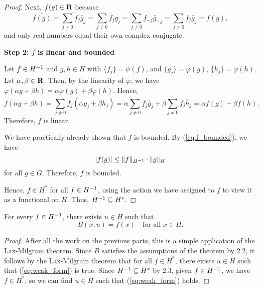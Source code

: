 \documentclass{homework}
\begin{document}
\begin{arabicparts}
\begin{proof}
			Next, $f(g) \in \textbf{R}$ because
			\begin{equation}
				\overline{f(g)}=\overline{\sum_{j\ne0}f_j\bar{g}_j} = \sum_{j\ne0}\bar{f}_jg_j = \sum_{j\ne0}f_{-j}\bar{g}_{-j} = \sum_{j\ne0}f_j\bar{g}_j = f(g),
			\end{equation}
			and only real numbers equal their own complex conjugate.
			
			\textbf{Step 2: $f$ is linear and bounded}
			
			Let $f \in {H^{-1}}$ and $g,h \in H$ with $\{f_j\} = \psi(f)$, and $\{g_j\} = \varphi(g)$, $\{h_j\} = \varphi(h)$. Let $\alpha,\beta\in\textbf{R}$. Then, by the linearity of $\varphi$, we have $\varphi(\alpha g + \beta h) = \alpha\varphi(g) + \beta\varphi(h)$. Hence,
			\begin{equation}
				f(\alpha g + \beta h) = \sum_{j\ne0} f_j\overline{(\alpha g_j + \beta h_j)} = \alpha\sum_{j\ne0}f_j\bar{g}_j + \beta\sum_{j\ne0}f_j\bar{h}_j = \alpha f(g) + \beta f(h).
			\end{equation}
			Therefore, $f$ is linear.
			
			We have practically already shown that $f$ is bounded. By (\ref{eq:f_bounded}), we have
			\begin{equation}
				|f(g)| \le \lVert f\rVert_{H^{-1}}\cdot\lVert g\rVert_H
			\end{equation}
			for all $g \in G$. Therefore, $f$ is bounded.
			
			Hence, $f \in H^*$ for all $f \in {H^{-1}}$, using the action we have assigned to $f$ to view it as a functional on $H$. Thus, ${H^{-1}} \subseteq H^*$.
		\end{proof}
		
		\questionpart
		For every $f \in {H^{-1}}$, there exists $u \in H$ such that
		\begin{equation}
			\label{eq:weak_form}
			B(x,u) = f(x) \quad\text{for all } x\in H.
		\end{equation}
		
		\begin{proof}
			After all the work on the previous parts, this is a simple application of the Lax-Milgram theorem. Since $B$ satisfies the assumptions of the theorem by 2.2, it follows by the Lax-Milgram theorem that for all $f \in H^*$, there exists $u \in H$ such that (\ref{eq:weak_form}) is true. Since ${H^{-1}} \subseteq H^*$ by 2.3, given $f \in {H^{-1}}$, we have $f \in H^*$, so we can find $u\in H$ such that (\ref{eq:weak_form}) holds.
		\end{proof}
		

\end{arabicparts}
\end{document}
